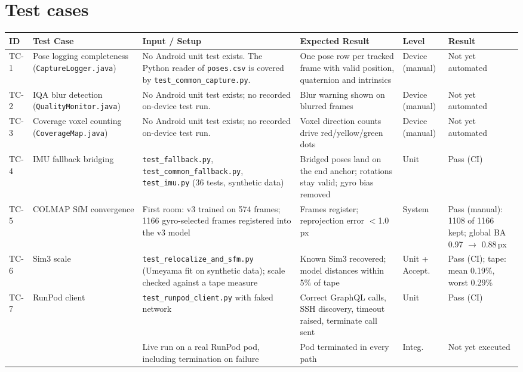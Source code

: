 \section{Test cases}

{\small\setlength{\tabcolsep}{3pt}
\begin{longtable}{p{}p{}p{}p{}p{}p{}}
\toprule
\textbf{ID} & \textbf{Test Case} & \textbf{Input / Setup} & \textbf{Expected Result} & \textbf{Level} & \textbf{Result} \\
\midrule
\endhead
TC-1 & Pose logging completeness (\texttt{CaptureLogger.java}) & No Android unit test exists. The Python reader of \texttt{poses.csv} is covered by \texttt{test\_common\_capture.py}. & One pose row per tracked frame with valid position, quaternion and intrinsics & Device (manual) & Not yet automated \\
\midrule
TC-2 & IQA blur detection (\texttt{QualityMonitor.java}) & No Android unit test exists; no recorded on-device test run. & Blur warning shown on blurred frames & Device (manual) & Not yet automated \\
\midrule
TC-3 & Coverage voxel counting (\texttt{CoverageMap.java}) & No Android unit test exists; no recorded on-device test run. & Voxel direction counts drive red/yellow/green dots & Device (manual) & Not yet automated \\
\midrule
TC-4 & IMU fallback bridging & \texttt{test\_fallback.py}, \texttt{test\_common\_fallback.py}, \texttt{test\_imu.py} (36 tests, synthetic data) & Bridged poses land on the end anchor; rotations stay valid; gyro bias removed & Unit & Pass (CI) \\
\midrule
TC-5 & COLMAP SfM convergence & First room: v3 trained on 574 frames; 1166 gyro-selected frames registered into the v3 model & Frames register; reprojection error $<$1.0\,px & System & Pass (manual): 1108 of 1166 kept; global BA 0.97 $\rightarrow$ 0.88\,px \\
\midrule
TC-6 & Sim3 scale & \texttt{test\_relocalize\_and\_sfm.py} (Umeyama fit on synthetic data); scale checked against a tape measure & Known Sim3 recovered; model distances within 5\% of tape & Unit + Accept. & Pass (CI); tape: mean 0.19\%, worst 0.29\% \\
\midrule
TC-7 & RunPod client & \texttt{test\_runpod\_client.py} with faked network & Correct GraphQL calls, SSH discovery, timeout raised, terminate call sent & Unit & Pass (CI) \\
& & Live run on a real RunPod pod, including termination on failure & Pod terminated in every path & Integ. & Not yet executed \\

\end{longtable}}
